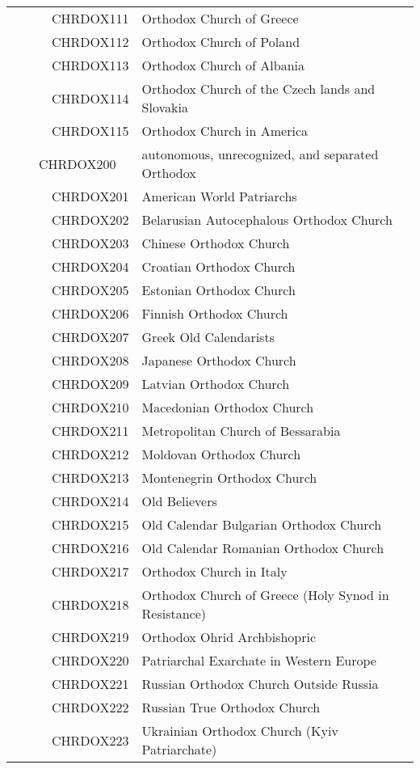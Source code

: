 \documentclass[12pt]{article}
\begin{document}
\begin{tiny}
\begin{center}
\begin{longtable}{|l|l|}
~~~~~~CHRDOX111 & Orthodox Church of Greece \\
~~~~~~CHRDOX112 & Orthodox Church of Poland \\
~~~~~~CHRDOX113 & Orthodox Church of Albania \\
~~~~~~CHRDOX114 & Orthodox Church of the Czech lands and Slovakia \\
~~~~~~CHRDOX115 & Orthodox Church in America \\
~~~~CHRDOX200 & autonomous, unrecognized, and separated Orthodox \\
~~~~~~CHRDOX201 & American World Patriarchs \\
~~~~~~CHRDOX202 & Belarusian Autocephalous Orthodox Church \\
~~~~~~CHRDOX203 & Chinese Orthodox Church \\
~~~~~~CHRDOX204 & Croatian Orthodox Church \\
~~~~~~CHRDOX205 & Estonian Orthodox Church \\
~~~~~~CHRDOX206 & Finnish Orthodox Church \\
~~~~~~CHRDOX207 & Greek Old Calendarists \\
~~~~~~CHRDOX208 & Japanese Orthodox Church \\
~~~~~~CHRDOX209 & Latvian Orthodox Church \\
~~~~~~CHRDOX210 & Macedonian Orthodox Church \\
~~~~~~CHRDOX211 & Metropolitan Church of Bessarabia \\
~~~~~~CHRDOX212 & Moldovan Orthodox Church \\
~~~~~~CHRDOX213 & Montenegrin Orthodox Church \\
~~~~~~CHRDOX214 & Old Believers \\
~~~~~~CHRDOX215 & Old Calendar Bulgarian Orthodox Church \\
~~~~~~CHRDOX216 & Old Calendar Romanian Orthodox Church \\
~~~~~~CHRDOX217 & Orthodox Church in Italy \\
~~~~~~CHRDOX218 & Orthodox Church of Greece (Holy Synod in Resistance) \\
~~~~~~CHRDOX219 & Orthodox Ohrid Archbishopric \\
~~~~~~CHRDOX220 & Patriarchal Exarchate in Western Europe \\
~~~~~~CHRDOX221 & Russian Orthodox Church Outside Russia \\
~~~~~~CHRDOX222 & Russian True Orthodox Church \\
~~~~~~CHRDOX223 & Ukrainian Orthodox Church (Kyiv Patriarchate) \\

\end{longtable}
\end{center}
\end{tiny}
\end{document}
